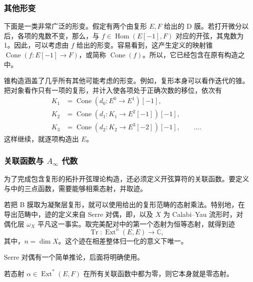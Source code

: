 \subsubsection{其他形变}\label{sec:5.3.2.2}

下面是一类非常广泛的形变。假定有两个由复形 $E,F$ 给出的 D 膜。若打开微分以后，各项的鬼数不变，那么，与 $f\in\operatorname{Hom}(E[-1],F)$ 对应的开弦，其鬼数为1。因此，可以考虑由 $f$ 给出的形变。容易看到，这产生定义的映射锥 $\operatorname{Cone}(f\colon E[-1]\to F)$，或简称 $\operatorname{Cone}(f)$。所以，它已经包含在原有构造之中。

锥构造涵盖了几乎所有其他可能考虑的形变。例如，复形本身可以看作迭代的锥。把对象看作只有一项的复形，并计入使各项处于正确次数的移位，依次有
\begin{equation}\label{eq:5.53}
\begin{aligned}
K_1&=\operatorname{Cone}(d_0\colon E^0\to E^1)[-1],\\
K_2&=\operatorname{Cone}(d_1\colon K_1\to E^2[-1])[-1],\\
K_3&=\operatorname{Cone}(d_2\colon K_2\to E^3[-2])[-1],\qquad\ldots.
\end{aligned}
\end{equation}
这样继续，就逐项构造出 $E$。

\subsubsection{关联函数与 \texorpdfstring{$A_\infty$}{A∞} 代数}\label{sec:5.3.2.3}

为了完成包含复形的拓扑开弦理论构造，还必须定义开弦算符的关联函数。要定义\allowbreak 与\allowbreak 中的三点函数，需要能够相乘态射，并取迹。

若把 B 膜取为凝聚层复形，就可以使用给出的复形范畴的态射乘法。特别地，在导出范畴中，迹的定义来自 Serre 对偶，即，以及 $X$ 为 Calabi--Yau 流形时，对偶化层 $\omega_X$ 平凡这一事实。取完美配对中的第一个态射为恒等态射，就得到迹
\[
\operatorname{Tr}\colon\operatorname{Ext}^n(E,E)\longrightarrow\mathbb{C},
\]
其中，$n=\dim X$。这个迹在相差整体归一化的意义下唯一。

Serre 对偶有一个简单推论，后面将明确使用。
\begin{corollary}\label{cor:5.11}
若态射 $\alpha\in\operatorname{Ext}^*(E,F)$ 在所有关联函数中都为零，则它本身就是零态射。
\end{corollary}

